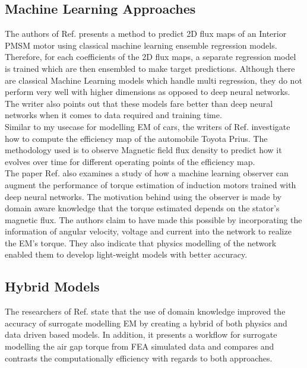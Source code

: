 \documentclass{report} %
\begin{document}
\subsection{Machine Learning Approaches}\label{subsec:LR Machine Learning Approaches}
The authors of Ref. \cite{EM 2DFMP-2022} presents a method to predict 2\ac{D} flux maps of an Interior \ac{PMSM} motor using classical machine learning ensemble 
regression models. Therefore, for each coefficients of the 2\ac{D} flux maps, a separate regression model is trained which are then ensembled to make target predictions. 
Although there are classical Machine Learning models which handle multi regression, they do not perform very well with higher dimensions as opposed to deep neural 
networks. The writer also points out that these models fare better than deep neural networks when it comes to data required and training time.\\

Similar to my usecase for modelling \ac{EM} of cars, the writers of Ref. \cite{ETA-V-2020} investigate how to compute the efficiency map of the automobile Toyota Prius. 
The methodology used is to observe Magnetic field flux density to predict how it evolves over time for different operating points of the efficiency map.\\
The paper Ref. \cite{HMLO-2021} also examines a study of how a machine learning observer can augment the performance of torque estimation of 
induction motors trained with deep neural networks. The motivation behind using the observer is made by domain aware knowledge that the torque estimated depends on 
the stator's magnetic flux. The authors claim to have made this possible by incorporating the information of angular velocity, voltage and current into the network to 
realize the \ac{EM}'s torque. They also indicate that physics modelling of the network enabled them to develop light-weight models with better accuracy.\\

\subsection{Hybrid Models}\label{subsec:LR Hybrid Models}
The researchers of Ref. \cite{SM EMT-2020} state that the use of domain knowledge improved the accuracy of surrogate modelling \ac{EM} by creating a hybrid of both 
physics and data driven based models. In addition, it presents a workflow for surrogate modelling the air gap torque from \ac{FEA} simulated data and compares 
and contrasts the computationally efficiency with regards to both approaches. \\
\end{document}
